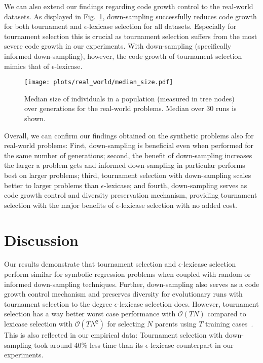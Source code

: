 \documentclass[runningheads]{llncs}
\begin{document}
We can also extend our findings regarding code growth control to the real-world datasets. As displayed in Fig.~\ref{fig:real_world-size}, down-sampling successfully reduces code growth for both tournament and $\epsilon$-lexicase selection for all datasets. Especially for tournament selection this is crucial as tournament selection suffers from the most severe code growth in our experiments. With down-sampling (specifically informed down-sampling), however, the code growth of tournament selection mimics that of $\epsilon$-lexicase.

\begin{figure}
    \centering
    \texttt{[image: plots/real\_world/median\_size.pdf]}
    \caption{Median size of individuals in a population (measured in tree nodes) over generations for the real-world problems. Median over 30 runs is shown.}
    \label{fig:real_world-size}
\end{figure}

Overall, we can confirm our findings obtained on the synthetic problems also for real-world problems: First, down-sampling is beneficial even when performed for the same number of generations; second, the benefit of down-sampling increases the larger a problem gets and informed down-sampling in particular performs best on larger problems; third, tournament selection with down-sampling scales better to larger problems than $\epsilon$-lexicase; and fourth, down-sampling serves as code growth control and diversity preservation mechanism, providing tournament selection with the major benefits of $\epsilon$-lexicase selection with no added cost. 



\section{Discussion}
\label{sec:discussion}

Our results demonstrate that tournament selection and $\epsilon$-lexicase selection perform similar for symbolic regression problems when coupled with random or informed down-sampling techniques. Further, down-sampling also serves as a code growth control mechanism and preserves diversity for evolutionary runs with tournament selection to the degree $\epsilon$-lexicase selection does. However, tournament selection has a way better worst case performance with $\mathcal{O}(TN)$ compared to lexicase selection with $\mathcal{O}(TN^2)$ for selecting $N$ parents using $T$ training cases~\cite{LaCava.2019}. This is also reflected in our empirical data: Tournament selection with down-sampling took around 40\% less time than its $\epsilon$-lexicase counterpart in our experiments.
\end{document}

